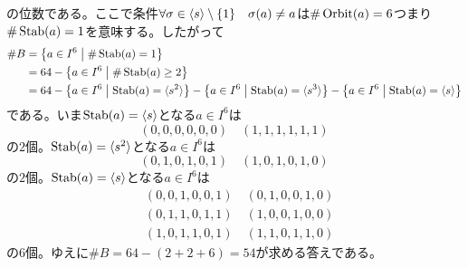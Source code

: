 \begin{sol}
\[\]
の位数である。ここで条件$\forall {\sigma} \in \langle s \rangle \setminus \{ 1 \} \quad {\sigma}(a) \neq a$は$\# \operatorname{Orbit} (a) = 6$つまり$\# \operatorname{Stab}(a) = 1$を意味する。したがって
\begin{align*}
  \# B &=  \left\{  a \in I^6  \mathrel{} \middle| \mathrel{}  \# \operatorname{Stab}(a) = 1   \right\} \\
  &= 64 - \left\{  a \in I^6  \mathrel{} \middle| \mathrel{}  \# \operatorname{Stab}(a) \geq 2   \right\} \\
  &= 64-  \left\{  a \in I^6  \mathrel{} \middle| \mathrel{}  \operatorname{Stab}(a) = \langle s^2 \rangle   \right\} - \left\{  a \in I^6  \mathrel{} \middle| \mathrel{}  \operatorname{Stab}(a) = \langle s^3 \rangle   \right\} - \left\{  a \in I^6  \mathrel{} \middle| \mathrel{}  \operatorname{Stab}(a) = \langle s \rangle   \right\}
\end{align*}
である。いま$\operatorname{Stab}(a) = \langle s \rangle$となる$a \in I^6$は
\[
(0,0,0,0,0,0) \quad (1,1,1,1,1,1)
\]
の$2$個。$\operatorname{Stab}(a) = \langle s^2 \rangle$となる$a \in I^6$は
\[
(0,1,0,1,0,1) \quad (1,0,1,0,1,0)
\]
の$2$個。$\operatorname{Stab}(a) = \langle s \rangle$となる$a \in I^6$は
\begin{align*}
  &(0,0,1,0,0,1) \quad (0,1,0,0,1,0) \\
&(0,1,1,0,1,1) \quad (1,0,0,1,0,0) \\
&(1,0,1,1,0,1) \quad (1,1,0,1,1,0)
\end{align*}
の$6$個。ゆえに$\# B = 64 - (2+2+6) = 54$が求める答えである。
\end{sol}
